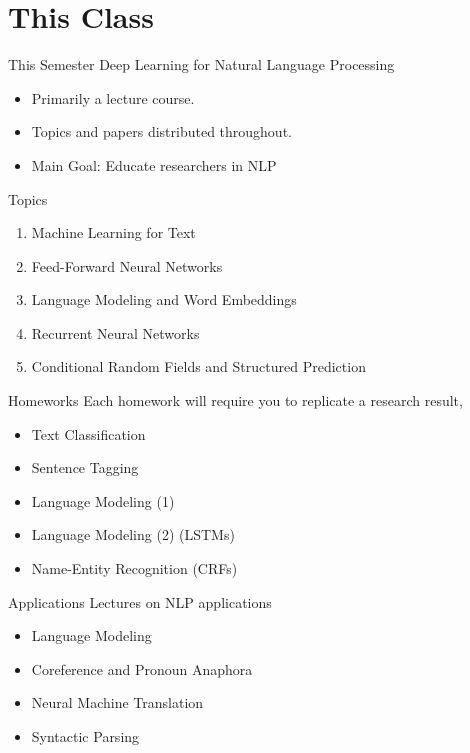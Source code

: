 \documentclass{beamer}
\begin{document}
\section{This Class}

\begin{frame}{This Semester}
  Deep Learning for Natural Language Processing

  \begin{itemize}
  \item Primarily a lecture course. 
    \air 

  \item Topics and papers distributed throughout.
    \air

  \item Main Goal: Educate researchers in NLP
  \end{itemize}
\end{frame}

\begin{frame}{Topics}

  \begin{enumerate}
  \item Machine Learning for Text
    \pause
    \air
  \item Feed-Forward Neural Networks
    \pause
    \air 
  \item Language Modeling and Word Embeddings 
    \pause
    \air
  \item Recurrent Neural Networks
    \pause
    \air
  \item Conditional Random Fields and Structured Prediction
  \end{enumerate}


\end{frame}

\begin{frame}{Homeworks}
  Each homework will require you to replicate a research result,

  \begin{itemize}
  \item Text Classification
  \item Sentence Tagging
  \item Language Modeling (1)
  \item Language Modeling (2) (LSTMs)
  \item Name-Entity Recognition (CRFs)
  \end{itemize}

\end{frame}

\begin{frame}{Applications}
  Lectures on NLP applications
  
  \begin{itemize}
  \item Language Modeling
    \air 
  \item Coreference and Pronoun Anaphora
    \air

  \item Neural Machine Translation
    \air 

  \item Syntactic Parsing

  \end{itemize}
\end{frame}
\end{document}
